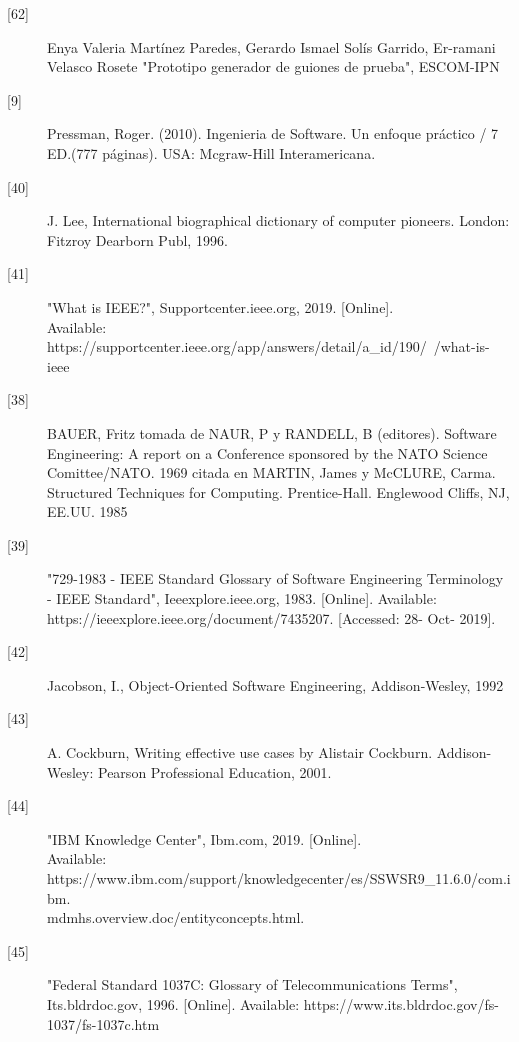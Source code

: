 \begin{description}
 		\item[\hypertarget{b62}{[62]}] Enya Valeria Martínez Paredes, Gerardo Ismael Solís Garrido, Er-ramani Velasco Rosete "Prototipo generador de guiones de prueba", ESCOM-IPN
 	
		\item[\hypertarget{b09}{[9]}] Pressman, Roger. (2010). Ingenieria de Software. Un enfoque práctico / 7 ED.(777 páginas). USA: Mcgraw-Hill Interamericana.
		
		\item[\hypertarget{b40}{[40]}] J. Lee, International biographical dictionary of computer pioneers. London: Fitzroy Dearborn Publ, 1996.
		
		\item[\hypertarget{b41}{[41]}] "What is IEEE?", Supportcenter.ieee.org, 2019. [Online].\\
		Available: https://supportcenter.ieee.org/app/answers/detail/a\_id/190/~/what-is-ieee
		
		\item[\hypertarget{b38}{[38]}] BAUER, Fritz tomada de NAUR, P y RANDELL, B (editores). Software Engineering: A report on a Conference sponsored by the NATO Science Comittee/NATO. 1969 citada en MARTIN, James y McCLURE, Carma. Structured
		Techniques for Computing. Prentice-Hall. Englewood Cliffs, NJ, EE.UU. 1985 
		
		\item[\hypertarget{b39}{[39]}] "729-1983 - IEEE Standard Glossary of Software Engineering Terminology - IEEE Standard", Ieeexplore.ieee.org, 1983. [Online]. Available: https://ieeexplore.ieee.org/document/7435207. [Accessed: 28- Oct- 2019].
		
		\item[\hypertarget{b42}{[42]}] Jacobson, I., Object-Oriented Software Engineering, Addison-Wesley, 1992
		
		\item[\hypertarget{b43}{[43]}] A. Cockburn, Writing effective use cases by Alistair Cockburn. Addison-Wesley: Pearson Professional Education, 2001.
		
		\item[\hypertarget{b44}{[44]}] "IBM Knowledge Center", Ibm.com, 2019. [Online].\\ Available: https://www.ibm.com/support/knowledgecenter/es/SSWSR9\_11.6.0/com.ibm.\\mdmhs.overview.doc/entityconcepts.html.
		
		\item[\hypertarget{b45}{[45]}] "Federal Standard 1037C: Glossary of Telecommunications Terms", Its.bldrdoc.gov, 1996. [Online]. Available: https://www.its.bldrdoc.gov/fs-1037/fs-1037c.htm
		

\end{description}
